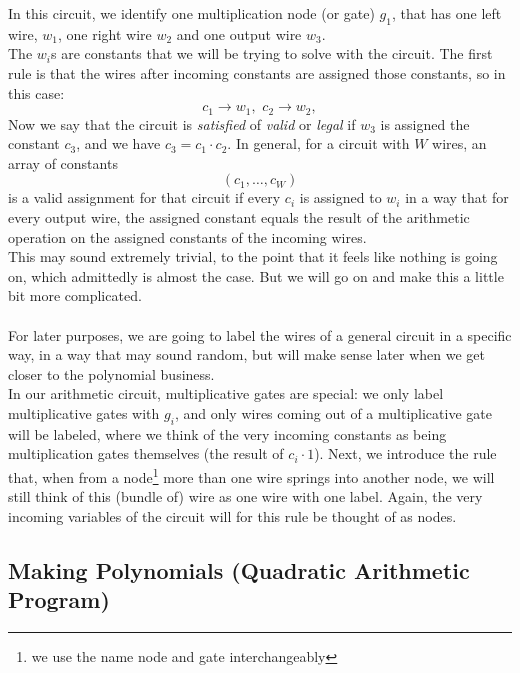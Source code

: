 \documentclass[11pt,oneside]{article}
\theoremstyle{definition}
\theoremstyle{remark}
\numberwithin{equation}{section}
\begin{document}
In this circuit, we identify one multiplication node (or gate) $g_1$, that has one left wire, $w_1$, one right wire $w_2$ and one output wire $w_3$.\\
The $w_i$s are constants that we will be trying to solve with the circuit. The first rule is that the wires after incoming constants are assigned those constants, so in this case:
$$c_1\rightarrow w_1,\,\,c_2\rightarrow w_2,$$
Now we say that the circuit is \emph{satisfied} of \emph{valid} or \emph{legal} if $w_3$ is assigned the constant $c_3$, and we have $c_3=c_1\cdot c_2$. In general, for a circuit with $W$ wires, an array of constants $$(c_1,\ldots,c_W)$$ is a valid assignment for that circuit if every $c_i$ is assigned to $w_i$ in a way that for every output wire, the assigned constant equals the result of the arithmetic operation on the assigned constants of the incoming wires.\\ 
This may sound extremely trivial, to the point that it feels like nothing is going on, which admittedly is almost the case. But we will go on and make this a little bit more complicated.\\ \\
For later purposes, we are going to label the wires of a general circuit in a specific way, in a way that may sound random, but will make sense later when we get closer to the polynomial business.\\
In our arithmetic circuit, multiplicative gates are special: we only label multiplicative gates with $g_i$, and only wires coming out of a multiplicative gate will be labeled, where we think of the very incoming constants as being multiplication gates themselves (the result of $c_i \cdot 1$). Next, we introduce the rule that, when from a node\footnote{we use the name node and gate interchangeably} more than one wire springs into another node, we will still think of this (bundle of) wire as one wire with one label. Again, the very incoming variables of the circuit will for this rule be thought of as nodes.

\subsection{Making Polynomials (Quadratic Arithmetic Program)}
\end{document}
